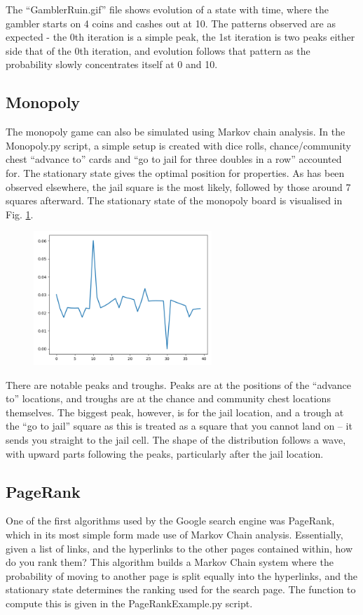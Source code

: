 \documentclass[12pt]{article}
\begin{document}
The ``GamblerRuin.gif'' file shows evolution of a state with time, where the gambler starts on 4 coins and cashes out at 10. 
The patterns observed are as expected - the 0th iteration is a simple peak, the 1st iteration is two peaks either side that of the 0th iteration, and evolution follows that pattern as the probability slowly concentrates itself at 0 and 10.

\subsection{Monopoly}

The monopoly game can also be simulated using Markov chain analysis. In the Monopoly.py script, a simple setup is created with dice rolls, chance/community chest ``advance to'' cards and ``go to jail for three doubles in a row'' accounted for. The stationary state gives the optimal position for properties. 
As has been observed elsewhere, the jail square is the most likely, followed by those around 7 squares afterward.
The stationary state of the monopoly board is visualised in Fig. \ref{fig:monopoly}.

\begin{figure}\label{fig:monopoly}
	\centering
	\includegraphics[width=0.6\textwidth]{MonopolyStationary.png}
\end{figure}

There are notable peaks and troughs. Peaks are at the positions of the ``advance to'' locations, and troughs are at the chance and community chest locations themselves. The biggest peak, however, is for the jail location, and a trough at the ``go to jail'' square as this is treated as a square that you cannot land on -- it sends you straight to the jail cell. The shape of the distribution follows a wave, with upward parts following the peaks, particularly after the jail location.

\subsection{PageRank}

One of the first algorithms used by the Google search engine was PageRank, which in its most simple form made use of Markov Chain analysis.
Essentially, given a list of links, and the hyperlinks to the other pages contained within, how do you rank them?
This algorithm builds a Markov Chain system where the probability of moving to another page is split equally into the hyperlinks, and the stationary state determines the ranking used for the search page.
The function to compute this is given in the PageRankExample.py script.
\end{document}
